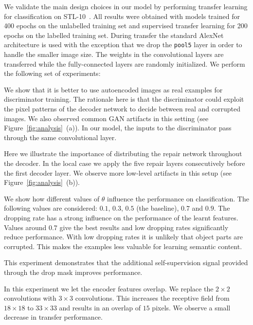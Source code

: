 \documentclass[10pt,twocolumn,letterpaper]{article}
\begin{document}
We validate the main design choices in our model by performing transfer learning for classification on STL-10~\cite{coates2011analysis}. All results were obtained with models trained for 400 epochs on the unlabelled training set and supervised transfer learning for 200 epochs on the labelled training set. During transfer the standard AlexNet architecture is used with the exception that we drop the \texttt{pool5} layer in order to handle the smaller image size. The weights in the convolutional layers are transferred while the fully-connected layers are randomly initialized.
We perform the following set of experiments:
\begin{description}
\setlength\itemsep{-0.1cm}
	\item [(a) Input image as real:] We show that it is better to use autoencoded images as real examples for discriminator training. The rationale here is that the discriminator could exploit the pixel patterns of the decoder network to decide between real and corrupted images. We also observed common GAN artifacts in this setting (see Figure~\ref{fig:analysis}~(a)). %
	In our model, the inputs to the discriminator pass through the same convolutional layer. 
	\item [(b) Distributed vs. local repair network:] Here we illustrate the importance of distributing the repair network throughout the decoder. In the local case we apply the five repair layers consecutively before the first decoder layer. We observe more low-level artifacts in this setup (see Figure~\ref{fig:analysis}~(b)). %
	\item [(c)-(f) Dropping rate:] We show how different values of $\theta$ influence the performance on classification. The following values are considered: $0.1$, $0.3$, $0.5$ (the baseline), $0.7$ and $0.9$. The dropping rate has a strong influence on the performance of the learnt features. Values around $0.7$ give the best results and low dropping rates significantly reduce performance. With low dropping rates it is unlikely that object parts are corrupted. This makes the examples less valuable for learning semantic content.
	\item [(g) Without mask prediction:] This experiment demonstrates that the additional self-supervision signal provided through the drop mask improves performance. 
	\item [(h) $3\times3$ encoder convolutions:] In this experiment we let the encoder features overlap. We replace the $2\times2$ convolutions with $3\times3$ convolutions. This increases the receptive field from $18\times18$ to $33\times33$ and results in an overlap of $15$ pixels. We observe a small decrease in transfer performance. 

\end{description}
\end{document}
